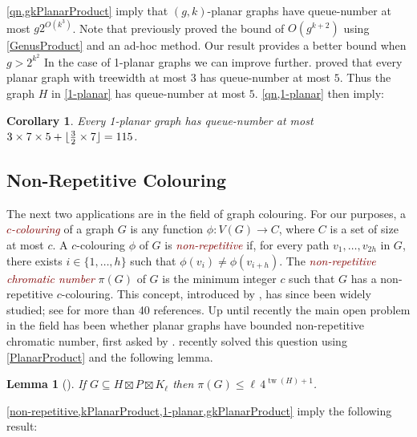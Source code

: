 \documentclass{patmorin}
\theoremstyle{plain}
\newtheorem{lem}[thm]{Lemma}
\newtheorem{cor}[thm]{Corollary}
\theoremstyle{definition}
\newcommand{\defin}[1]{\textcolor{Maroon}{\emph{#1}}}
\newcommand{\note}[2]{\noindent{\color{red}[#1:~#2]}}
\DeclareMathOperator{\tw}{tw}
\DeclarePairedDelimiter{\floor}{\lfloor}{\rfloor}
\renewcommand{\le}{\leqslant}
\begin{document}
\cref{qn,gkPlanarProduct} imply that $(g,k)$-planar graphs have queue-number at most $g 2^{O(k^3)}$.
Note that \citet{DJMMUW20} previously proved the bound of
$O(g^{k+2})$ using \cref{GenusProduct} and an ad-hoc method. Our result provides a better bound when $g>2^{k^2}$
In the case of 1-planar graphs we can improve further. \citet{ABGKP20} proved that every planar graph with treewidth at most $3$ has queue-number at most $5$. Thus the graph $H$ in \cref{1-planar} has queue-number at most $5$. \cref{qn,1-planar} then imply:

\begin{cor}
\label{1PlanarQueue}
Every 1-planar graph has queue-number at most $3 \times 7 \times 5 + \floor{\tfrac{3}{2} \times 7} = 115$.
\end{cor}


\subsection{Non-Repetitive Colouring}

The next two applications are in the field of graph colouring. For our purposes, a \defin{$c$-colouring} of a graph $G$ is any function $\phi\colon V(G)\to C$, where $C$ is a set of size at most $c$.
A $c$-colouring $\phi$ of $G$ is \defin{non-repetitive} if, for every path $v_1,\ldots,v_{2h}$ in $G$, there exists $i\in\{1,\ldots,h\}$ such that $\phi(v_i)\neq\phi(v_{i+h})$.  The \defin{non-repetitive chromatic number} $\pi(G)$ of $G$ is the minimum integer $c$ such that $G$ has a non-repetitive $c$-colouring. This concept, introduced by \citet{AGHR-RSA02}, has since been widely studied; see \citep{dujmovic.esperet.ea:planar} for more than 40 references. Up until recently the main open problem in the field has been whether planar graphs have bounded non-repetitive chromatic number, first asked by \citet{AGHR-RSA02}. \citet{dujmovic.esperet.ea:planar} recently solved this question using \cref{PlanarProduct} and the following lemma.

\begin{lem}[\citep{dujmovic.esperet.ea:planar}]
\label{non-repetitive}
If $G\subseteq H\boxtimes P \boxtimes K_\ell$ then $\pi(G)\le \ell\, 4^{\tw(H)+1}$.
\end{lem}

\cref{non-repetitive,kPlanarProduct,1-planar,gkPlanarProduct} imply the following result:
\end{document}
